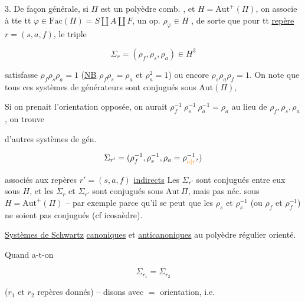 3. De façon générale, si $\Pi$ est un polyèdre comb.   , et $H=\mathrm{Aut}^{+}(\Pi)$, on  associe à tte   tt $\varphi\in\mathrm{Fac}(\Pi)=S\amalg A\amalg F$, un op. $\rho_\varphi\in H$ , de sorte que pour tt \uline{repère}  $r=(s,a,f)$, le triple

\[
\Sigma_r=(\rho_f,\rho_s,\rho_a)\in H^3
\]


satisfasse $\rho_f\rho_s\rho_a=1$ (\uline{NB} $\rho_f\rho_s=\rho_a$ et $\rho_a^2=1$) ou encore $\rho_s\rho_a\rho_f=1$. On note que tous ces systèmes de générateurs sont conjugués sous $\mathrm{Aut}(\Pi)$,


Si on prenait l'orientation opposée, on aurait $\rho_f^{-1}\ \rho_s^{-1}\ \rho_a^{-1}=\rho_a$ au lieu de $\rho_f,\rho_s,\rho_a$, on trouve


d'autres systèmes de gén.

\[
\Sigma_{r'}=(\rho_f^{-1},\rho_s^{-1},\rho_a=\rho_{\unsure{a|r}}^{-1})
\]

associés aux repères $r'=(s,a,f)$ \uline{indirects}
Les $\Sigma_{r'}$ sont conjugués entre eux sous $H$, et les $\Sigma_r$ et $\Sigma_{r'}$ sont conjugués sous $\mathrm{Aut}\,\Pi$, mais pas néc. sous $H=\mathrm{Aut}^{+}(\Pi)$ -- par exemple parce qu'il se peut que les $\rho_s$ et $\rho_s^{-1}$ (ou $\rho_f$ et $\rho_f^{-1}$) ne soient pas conjugués (cf icosaèdre).

\uline{Systèmes de Schwartz} \uline{canoniques} et \uline{anticanoniques}  au polyèdre régulier orienté.

Quand a-t-on

\[
\Sigma_{r_1}=\Sigma_{r_2}
\]

($r_1$ et $r_2$  repères donnés) -- disons avec $=$ orientation, i.e.

